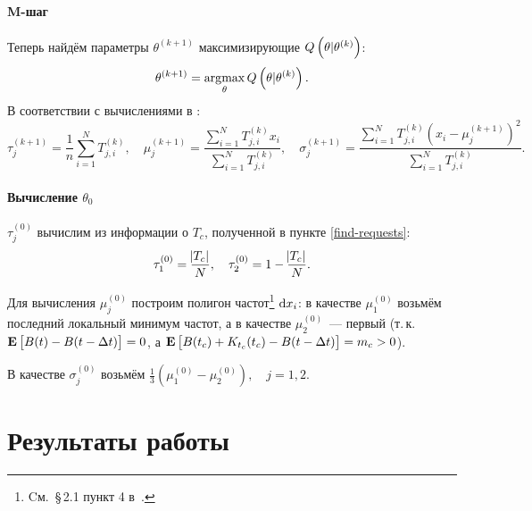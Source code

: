 \documentclass[a4paper,10pt]{article}
\DeclareMathOperator*{\argmax}{\arg\!\max}
\begin{document}
\paragraph*{M-шаг}%
Теперь найдём параметры $\theta^{(k+1)}$ максимизирующие 
$Q\del{\theta \vert \theta^{(k)}}$:
$$
\theta^{(k+1)} = \argmax\limits_{\theta} Q\del{\theta \vert \theta^{(k)}}.
$$
В соответствии с вычислениями в \cite{wiki:em-algorithm}:
$$
\tau_j^{(k+1)} = \frac{1}{n} \sum\limits_{i=1}^{N} T_{j,i}^{(k)},\quad
\mu_j^{(k+1)} = \frac
  {\sum\limits_{i=1}^{N} T_{j,i}^{(k)} x_i}
  {\sum\limits_{i=1}^{N} T_{j,i}^{(k)}},\quad
\sigma_j^{(k+1)} = \frac
  {\sum\limits_{i=1}^{N} T_{j,i}^{(k)} (x_i - \mu_j^{(k+1)})^2}
  {\sum\limits_{i=1}^{N} T_{j,i}^{(k)}}.
$$

\paragraph*{Вычисление $\theta_0$}
$\tau_j^{(0)}$ вычислим из информации о $T_c$, полученной в пункте 
\ref{find-requests}:
$$
\tau_1^{(0)} = \frac{\envert{T_c}}{N}, \quad
\tau_2^{(0)} = 1 - \frac{\envert{T_c}}{N}.
$$

Для вычисления $\mu_j^{(0)}$ построим полигон частот\footnote{%
Cм.~\S\,2.1 пункт 4 в~\cite{ivchmed2010matstat}.
} $\dif x_i$:
в качестве $\mu_1^{(0)}$ возьмём последний локальный минимум частот, 
а в качестве $\mu_2^{(0)}$~--- первый
(т.\,к.~$\mathbf{E}\sbr{B(t) - B(t - \Delta t)} = 0$, 
а $\mathbf{E}\sbr{B(t_c) + K_{t_c}(t_c) - B(t - \Delta t)} = m_c > 0$).

В качестве $\sigma_j^{(0)}$ возьмём $\frac{1}{3}(\mu_1^{(0)} - \mu_2^{(0)}), 
\quad j=1, 2$.

\section{Результаты работы}




\pagebreak



\end{document}
